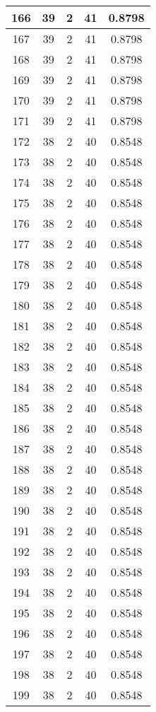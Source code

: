 \documentclass[letterpaper, 12pt]{article}
\begin{document}
\begin{longtable}{|c|c|c|c|c|}
\hline
166 & 39 & 2 & 41 & 0.8798 \\
\hline
167 & 39 & 2 & 41 & 0.8798 \\
\hline
168 & 39 & 2 & 41 & 0.8798 \\
\hline
169 & 39 & 2 & 41 & 0.8798 \\
\hline
170 & 39 & 2 & 41 & 0.8798 \\
\hline
171 & 39 & 2 & 41 & 0.8798 \\
\hline
172 & 38 & 2 & 40 & 0.8548 \\
\hline
173 & 38 & 2 & 40 & 0.8548 \\
\hline
174 & 38 & 2 & 40 & 0.8548 \\
\hline
175 & 38 & 2 & 40 & 0.8548 \\
\hline
176 & 38 & 2 & 40 & 0.8548 \\
\hline
177 & 38 & 2 & 40 & 0.8548 \\
\hline
178 & 38 & 2 & 40 & 0.8548 \\
\hline
179 & 38 & 2 & 40 & 0.8548 \\
\hline
180 & 38 & 2 & 40 & 0.8548 \\
\hline
181 & 38 & 2 & 40 & 0.8548 \\
\hline
182 & 38 & 2 & 40 & 0.8548 \\
\hline
183 & 38 & 2 & 40 & 0.8548 \\
\hline
184 & 38 & 2 & 40 & 0.8548 \\
\hline
185 & 38 & 2 & 40 & 0.8548 \\
\hline
186 & 38 & 2 & 40 & 0.8548 \\
\hline
187 & 38 & 2 & 40 & 0.8548 \\
\hline
188 & 38 & 2 & 40 & 0.8548 \\
\hline
189 & 38 & 2 & 40 & 0.8548 \\
\hline
190 & 38 & 2 & 40 & 0.8548 \\
\hline
191 & 38 & 2 & 40 & 0.8548 \\
\hline
192 & 38 & 2 & 40 & 0.8548 \\
\hline
193 & 38 & 2 & 40 & 0.8548 \\
\hline
194 & 38 & 2 & 40 & 0.8548 \\
\hline
195 & 38 & 2 & 40 & 0.8548 \\
\hline
196 & 38 & 2 & 40 & 0.8548 \\
\hline
197 & 38 & 2 & 40 & 0.8548 \\
\hline
198 & 38 & 2 & 40 & 0.8548 \\
\hline
199 & 38 & 2 & 40 & 0.8548 \\
\hline
\end{longtable}
\end{document}
